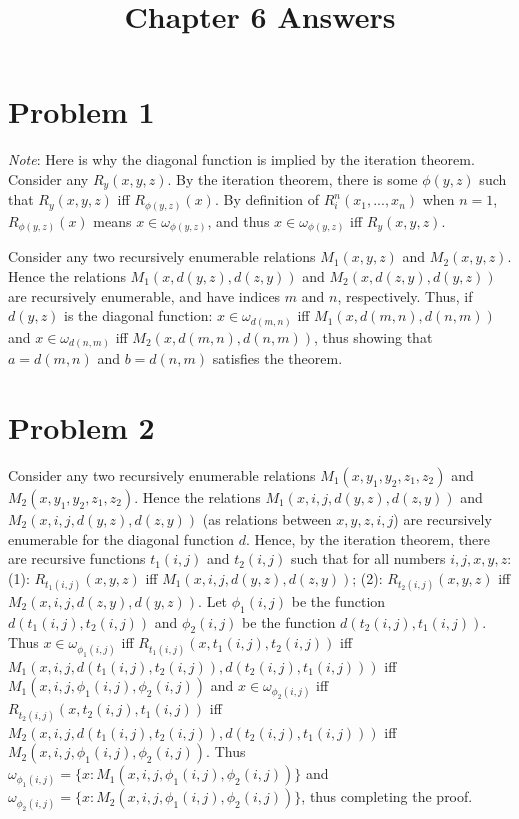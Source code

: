 \documentclass{article}
\title{Chapter 6 Answers}
\theoremstyle{definition}
\begin{document}
\date{}
\maketitle

\section*{Problem 1}
\textit{Note}: Here is why the diagonal function is implied by the iteration theorem. 
Consider any $R_y(x,y,z)$. By the iteration theorem, there is some $\phi(y,z)$ such that 
$R_y(x,y,z)$ iff $R_{\phi(y,z)}(x)$. By definition of $R^n_i(x_1,...,x_n)$ when $n=1$, $R_{\phi(y,z)}(x)$ means $x\in\omega_{\phi(y,z)}$, and thus 
$x\in\omega_{\phi(y,z)}$ iff $R_y(x,y,z)$.


Consider any two recursively enumerable relations $M_1(x,y,z)$ and $M_2(x,y,z)$. Hence the relations $M_1(x,d(y,z),d(z,y))$ and $M_2(x,d(z,y),d(y,z))$ are 
recursively enumerable, and have indices $m$ and $n$, respectively. Thus, if $d(y,z)$ is the diagonal function:
$x\in\omega_{d(m,n)}$ iff $M_1(x,d(m,n),d(n,m))$ and $x\in\omega_{d(n,m)}$ iff $M_2(x,d(m,n),d(n,m))$, thus showing that $a=d(m,n)$ and $b=d(n,m)$ satisfies the 
theorem.

\section*{Problem 2}
Consider any two recursively enumerable relations $M_1(x,y_1,y_2,z_1,z_2)$ and $M_2(x,y_1,y_2,z_1,z_2)$. Hence the relations 
$M_1(x,i,j,d(y,z),d(z,y))$ and $M_2(x,i,j,d(y,z),d(z,y))$ (as relations between $x,y,z,i,j$) are recursively enumerable for the diagonal function $d$. Hence, by the 
iteration theorem, there are recursive functions $t_1(i,j)$ and $t_2(i,j)$ such that for all numbers $i,j,x,y,z$:\newline
(1): $R_{t_1(i,j)}(x,y,z)$ iff $M_1(x,i,j,d(y,z),d(z,y))$;\newline
(2): $R_{t_2(i,j)}(x,y,z)$ iff $M_2(x,i,j,d(z,y),d(y,z))$.\newline
Let $\phi_1(i,j)$ be the function $d(t_1(i,j),t_2(i,j))$ and $\phi_2(i,j)$ be the function $d(t_2(i,j),t_1(i,j))$. Thus
$x\in\omega_{\phi_1(i,j)}$ iff $R_{t_1(i,j)}(x,t_1(i,j),t_2(i,j))$ iff $M_1(x,i,j,d(t_1(i,j),t_2(i,j)),d(t_2(i,j),t_1(i,j)))$ iff 
$M_1(x,i,j,\phi_1(i,j),\phi_2(i,j))$ and 
$x\in\omega_{\phi_2(i,j)}$ iff $R_{t_2(i,j)}(x,t_2(i,j),t_1(i,j))$ iff $M_2(x,i,j,d(t_1(i,j),t_2(i,j)),d(t_2(i,j),t_1(i,j)))$ iff $M_2(x,i,j,\phi_1(i,j),\phi_2(i,j))$.
Thus $\omega_{\phi_1(i,j)}=\{x:M_1(x,i,j,\phi_1(i,j),\phi_2(i,j))\}$ and $\omega_{\phi_2(i,j)}=\{x:M_2(x,i,j,\phi_1(i,j),\phi_2(i,j))\}$, thus completing the proof.
\end{document}
